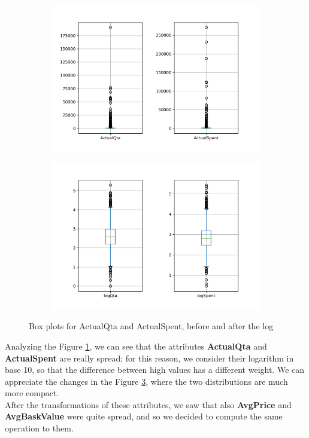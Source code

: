 \begin{figure}
\captionsetup{justification=centering}
\begin{subfigure}{0.5\textwidth}
\centering
\includegraphics[width=\textwidth]{img/boxplot_for_actuals.png}
\caption{}
\label{fig:boxplot_actuals}
\end{subfigure}
\begin{subfigure}{0.5\textwidth}
\centering
\includegraphics[width=\textwidth]{img/boxplot_for_log_actuals.png}
\caption{}
\label{fig:boxplot_logs}
\end{subfigure}
\caption{Box plots for ActualQta and ActualSpent, before and after the log}
\end{figure}

Analyzing the Figure \ref{fig:boxplot_actuals}, we can see that the attributes \textbf{ActualQta} and \textbf{ActualSpent} are really spread; for this reason, we consider their logarithm in base 10, so that the difference between high values has a different weight. We can appreciate the changes in the Figure \ref{fig:boxplot_logs}, where the two distributions are much more compact.\\
After the transformations of these attributes, we saw that also \textbf{AvgPrice} and \textbf{AvgBaskValue} were quite spread, and so we decided to compute the same operation to them.

